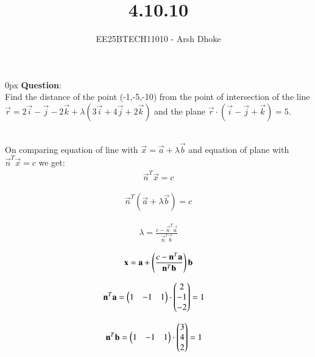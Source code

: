 \documentclass[journal]{IEEEtran}
\begin{document}

\vspace{3cm}

\title{4.10.10}
\author{EE25BTECH11010 - Arsh Dhoke}
{\let\newpage\relax\maketitle}

\renewcommand{\thefigure}{\theenumi}
\renewcommand{\thetable}{\theenumi}
\setlength{\intextsep}{10pt}
\renewcommand{\thetable}{\theenumi}

\parindent 0px
\textbf{Question}:\\
Find the distance of the point (-1,-5,-10) from the point of intersection of the line $\vec{r}=2\vec{i}-\vec{j}-2\vec{k}+ \lambda(3\vec{i}+4\vec{j}+2\vec{k})$ and the plane $\vec{r}\cdot(\vec{i}-\vec{j}+\vec{k})=5$.

\solution \\

On comparing equation of line with $\vec{x}=\vec{a}+ \lambda\vec{b}$
and equation of plane with $\vec{n}^T\vec{x}=c$ we get: \\






\begin{align}
    \vec{n}^T\vec{x}=c
\end{align}

\begin{align}
    \vec{n}^T(\vec{a}+ \lambda\vec{b})=c
\end{align}

\begin{align}
    \lambda=\frac{c-\vec{n}^T\vec{a}}{\vec{n}^T\vec{b}}
\end{align}

\begin{align}
\mathbf{x}=\mathbf{a}+ \left(\frac{c-\mathbf{n}^T\mathbf{a}}{\mathbf{n}^T\mathbf{b}}\right)\mathbf{b}    
\end{align}

\begin{align}
    \mathbf{n}^T\mathbf{a}=\begin{pmatrix}1 & -1 & 1\end{pmatrix}\cdot\begin{pmatrix}2 \\ -1 \\ -2\end{pmatrix}
    &=1
\end{align}

\begin{align}
    \mathbf{n}^T\mathbf{b}=\begin{pmatrix}1 & -1 & 1\end{pmatrix}\cdot\begin{pmatrix}3 \\ 4 \\ 2\end{pmatrix}
    &=1
\end{align}
\end{document}
